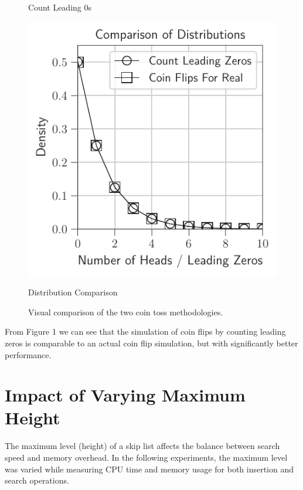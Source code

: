\documentclass{article}
\begin{document}
\begin{figure}[H]
\begin{minipage}{0.32\textwidth}
        \caption*{Count Leading 0s}
    \end{minipage}\hfill
    \begin{minipage}{0.32\textwidth}
        \centering
        \includegraphics[width=\linewidth]{../notebook/plot/comparison_of_distributions.pdf}
        \caption*{Distribution Comparison}
    \end{minipage}
    \caption{Visual comparison of the two coin toss methodologies.}
    \label{fig:coin_toss_methods}
\end{figure}

From Figure 1 we can see that the simulation of coin flips by counting leading zeros is comparable to an actual coin flip simulation, but with significantly better performance.

\section{Impact of Varying Maximum Height}
The maximum level (height) of a skip list affects the balance between search speed and memory overhead. In the following experiments, the maximum level was varied while measuring CPU time and memory usage for both insertion and search operations.
\end{document}
